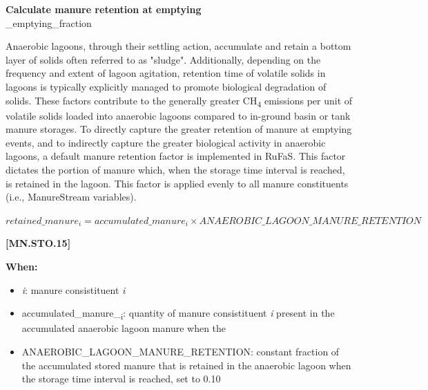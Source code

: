 \begin{refsection}
\begin{itemize}
    \end{itemize}
    \vspace{0.5cm}


\textbf{Calculate manure retention at emptying}\\
\_emptying\_fraction
\vspace{0.2cm}

Anaerobic lagoons, through their settling action, accumulate and retain a bottom layer of solids often referred to as "sludge". Additionally, depending on the frequency and extent of lagoon agitation, retention time of volatile solids in lagoons is typically explicitly managed to promote biological degradation of solids. These factors contribute to the generally greater CH\textsubscript{4} emissions per unit of volatile solids loaded into anaerobic lagoons compared to in-ground basin or tank manure storages. To directly capture the greater retention of manure at emptying events, and to indirectly capture the greater biological activity in anaerobic lagoons, a default manure retention factor is implemented in RuFaS. This factor dictates the portion of manure which, when the storage time interval is reached, is retained in the lagoon. This factor is applied evenly to all manure constituents (i.e., ManureStream variables).
\vspace{0.5cm}

    \begin{center}
        \(retained\_manure_{i} = accumulated\_manure_{i} \times ANAEROBIC\_LAGOON\_MANURE\_RETENTION \)
    \end{center}
        \vspace{0.2cm} 
    
            {\raggedleft \textbf{[MN.STO.15]}\par}
            \vspace{0.2cm}

    \textbf{When:}
    \begin{itemize}
        \item \textit{i}: manure consistituent \textit{i}
        \item accumulated\_manure\_\textsubscript{i}: quantity of manure consistituent \textit{i} present in the accumulated anaerobic lagoon manure when the 
        \item ANAEROBIC\_LAGOON\_MANURE\_RETENTION: constant fraction of the accumulated stored manure that is retained in the anaerobic lagoon when the storage time interval is reached, set to 0.10
    \end{itemize}
    \vspace{0.5cm}





\end{refsection}
